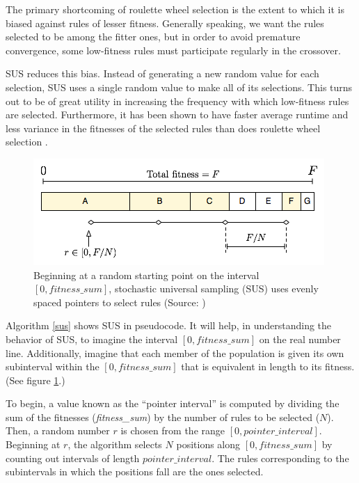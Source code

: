 \documentclass[12pt,twoside]{article}
\begin{document}
The primary shortcoming of roulette wheel selection is the extent to which it is biased against rules of lesser fitness. Generally speaking, we want the rules selected to be among the fitter ones, but in order to avoid premature convergence, some low-fitness rules must participate regularly in the crossover.

SUS reduces this bias. Instead of generating a new random value for each selection, SUS uses a single random value to make all of its selections. This turns out to be of great utility in increasing the frequency with which low-fitness rules are selected.
Furthermore, it has been shown to have faster average runtime and less variance in the fitnesses of the selected rules than does roulette wheel selection \cite{tobias_blickle_comparison_1995}.

\begin{figure}
\centering
\includegraphics[scale=0.6]{images/sus.png}
\caption[Stochastic Universal Sampling (Pointer Intervals)]{Beginning at a random starting point on the interval $[0,fitness\_sum]$, stochastic universal sampling (SUS) uses evenly spaced pointers to select rules (Source: \cite{assumed_diagram_2007})}
\label{sus_graphic}
\end{figure}

Algorithm \ref{sus} shows SUS in pseudocode. It will help, in understanding the behavior of SUS, to imagine the interval $[0, fitness\_sum]$ on the real number line. Additionally, imagine that each member of the population is given its own subinterval within the $[0, fitness\_sum]$ that is equivalent in length to its fitness. (See figure \ref{sus_graphic}.)

To begin, a value known as the ``pointer interval'' is computed by dividing the sum of the fitnesses (\emph{fitness\_sum}) by the number of rules to be selected ($N$). Then, a random number $r$ is chosen from the range $[0, pointer\_interval]$. Beginning at $r$, the algorithm selects $N$ positions along $[0, fitness\_sum]$ by counting out intervals of length $pointer\_interval$. The rules corresponding to the subintervals in which the positions fall are the ones selected.
\end{document}

